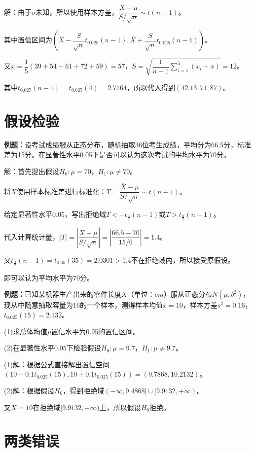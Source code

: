 \documentclass[UTF8, 12pt]{ctexart}
\begin{document}
解：由于$\sigma$未知，所以使用样本方差，$\dfrac{\overline{X}-\mu}{S/\sqrt{n}}\sim t(n-1)$。

其中置信区间为$\left(\overline{X}-\dfrac{S}{\sqrt{n}}t_{0.025}(n-1),\overline{X}+\dfrac{S}{\sqrt{n}}t_{0.025}(n-1)\right)$。

又$\overline{x}=\dfrac{1}{5}(39+54+61+72+59)=57$，$S=\sqrt{\dfrac{1}{n-1}\sum\limits_{i=1}^5(x_i-\overline{x})}=12$。

其中$t_{0.025}(n-1)=t_{0.025}(4)=2.7764$，所以代入得到$(42.13,71,87)$。

\section{假设检验}

\textbf{例题：}设考试成绩服从正态分布，随机抽取36位考生成绩，平均分为66.5分，标准差为15分。在显著性水平0.05下是否可以认为这次考试的平均水平为70分。

解：首先提出假设$H_0:\mu=70$，$H_1:\mu\neq70$。

将$X$使用样本标准差进行标准化：$T=\dfrac{\overline{X}-\mu}{S/\sqrt{n}}\sim t(n-1)$。

给定显著性水平$0.05$，写出拒绝域$T<-t_{\frac{\alpha}{2}}(n-1)$或$T>t_{\frac{\alpha}{2}}(n-1)$。

代入计算统计量，$\vert T\vert=\left\vert\dfrac{\overline{X}-\mu}{S/\sqrt{n}}\right\vert=\left\vert\dfrac{66.5-70}{15/6}\right\vert=1.4$。

又$t_{\frac{\alpha}{2}}(n-1)=t_{0.05}(35)=2.0301>1.4$不在拒绝域内，所以接受原假设。

即可以认为平均水平为70分。

\textbf{例题：}已知某机器生产出来的零件长度$X$（单位：$cm$）服从正态分布$N(\mu,\delta^2)$，现从中随意抽取容量为16的一个样本，测得样本均值$\overline{x}=10$，样本方差$s^2=0.16$，$t_{0.025}(15)=2.132$。

(1)求总体均值$\mu$置信水平为0.95的置信区间。

(2)在显著性水平$0.05$下检验假设$H_0:\mu=9.7$，$H_1:\mu\neq9.7$。

(1)解：根据公式直接解出置信空间$(10-0.1t_{0.025}(15),10+0.1t_{0.025}(15))=(9.7868,10.2132)$。

(2)解：根据假设$H_0$，得到拒绝域$(-\infty,9.4868]\cup[9.9132,+\infty)$。

又$\overline{X}=10$在拒绝域$[9.9132,+\infty)$上，所以假设$H_0$拒绝。

\section{两类错误}
\end{document}

